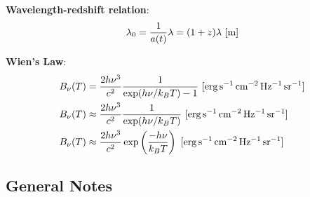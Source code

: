 \documentclass[a4paper,11pt]{article}
\begin{document}
{\noindent}\textbf{Wavelength-redshift relation}:
\begin{align*}
    \lambda_0 = \frac{1}{a(t)}\lambda = (1+z)\lambda ~ [{\rm m}]
\end{align*}

{\noindent}\textbf{Wien's Law}:
\begin{align*}
    B_\nu(T) &= \frac{2h\nu^3}{c^2} \frac{1}{\exp(h\nu/k_BT) - 1} ~ [{\rm erg\,s^{-1}\,cm^{-2}\,Hz^{-1}\,sr^{-1}}] \\
    B_\nu(T) &\approx \frac{2h\nu^3}{c^2} \frac{1}{\exp(h\nu/k_BT)} ~ [{\rm erg\,s^{-1}\,cm^{-2}\,Hz^{-1}\,sr^{-1}}] \\
    B_\nu(T) &\approx \frac{2h\nu^3}{c^2} \exp\left(\frac{-h\nu}{k_BT}\right) ~ [{\rm erg\,s^{-1}\,cm^{-2}\,Hz^{-1}\,sr^{-1}}]
\end{align*}







































\newpage
\subsection{General Notes}
\end{document}
